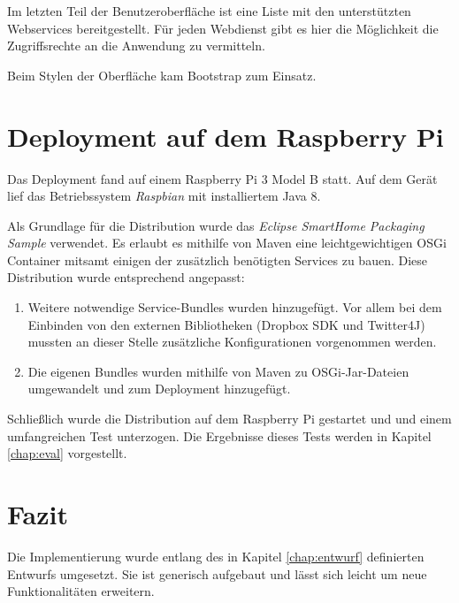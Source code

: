 Im letzten Teil der Benutzeroberfläche ist eine Liste mit den unterstützten Webservices bereitgestellt. Für jeden Webdienst gibt es hier die Möglichkeit die Zugriffsrechte an die Anwendung zu vermitteln.

Beim Stylen der Oberfläche kam Bootstrap\cite{bootstrap} zum Einsatz.


\section{Deployment auf dem Raspberry Pi}
\label{impl:deployment}
Das Deployment fand auf einem Raspberry Pi 3 Model B statt. Auf dem Gerät lief das Betriebssystem \textit{Raspbian} mit installiertem Java 8.

Als Grundlage für die Distribution wurde das \textit{Eclipse SmartHome Packaging Sample} verwendet. Es erlaubt es mithilfe von Maven eine leichtgewichtigen OSGi Container mitsamt einigen der zusätzlich benötigten Services zu bauen. Diese Distribution wurde entsprechend angepasst: 
\begin{enumerate}
\item Weitere notwendige Service-Bundles wurden hinzugefügt. Vor allem bei dem Einbinden von den externen Bibliotheken (Dropbox SDK und Twitter4J) mussten an dieser Stelle zusätzliche Konfigurationen vorgenommen werden.
\item Die eigenen Bundles wurden mithilfe von Maven zu OSGi-Jar-Dateien umgewandelt und zum Deployment hinzugefügt.
\end{enumerate}

Schließlich wurde die Distribution auf dem Raspberry Pi gestartet und und einem umfangreichen Test unterzogen. Die Ergebnisse dieses Tests werden in Kapitel \ref{chap:eval} vorgestellt.


\section{Fazit}
Die Implementierung wurde entlang des in Kapitel \ref{chap:entwurf} definierten Entwurfs umgesetzt. Sie ist generisch aufgebaut und lässt sich leicht um neue Funktionalitäten erweitern.
